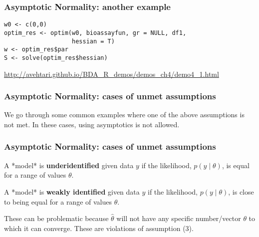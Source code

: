 \documentclass{beamer}
\begin{document}
\begin{frame}[fragile]
\frametitle{Asymptotic Normality: another example}

\begin{verbatim}
w0 <- c(0,0)
optim_res <- optim(w0, bioassayfun, gr = NULL, df1, 
                   hessian = T)
w <- optim_res$par
S <- solve(optim_res$hessian)
\end{verbatim}

\url{http://avehtari.github.io/BDA_R_demos/demos_ch4/demo4_1.html}

\end{frame}

\begin{frame}
\frametitle{Asymptotic Normality: cases of unmet assumptions}

We go through some common examples where one of the above assumptions is not met. In these cases, using asymptotics is not allowed.

\end{frame}



\begin{frame}
\frametitle{Asymptotic Normality: cases of unmet assumptions}

A *model* is {\bf underidentified} given data $y$ if the likelihood, $p(y \mid \theta)$, is equal for a range of values $\theta$. 
\newline

A *model* is {\bf weakly identified} given data $y$ if the likelihood, $p(y \mid \theta)$, is close to being equal for a range of values $\theta$. 
\newline

These can be problematic because $\hat{\theta}$ will not have any specific number/vector $\theta$ to which it can converge. These are violations of assumption (3).

\end{frame}
\end{document}
